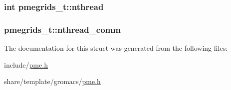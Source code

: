 \hypertarget{structpmegrids__t_a128cb4bc98b58e690cdf26e3d920a8ad}{
\subsubsection[{nthread}]{\setlength{\rightskip}{0pt plus 5cm}int {\bf pmegrids\-\_\-t\-::nthread}}}\label{structpmegrids__t_a128cb4bc98b58e690cdf26e3d920a8ad}
\hypertarget{structpmegrids__t_a89e6151b276245126d3a4fdea855df54}{
\subsubsection[{nthread\-\_\-comm}]{ {\bf pmegrids\-\_\-t\-::nthread\-\_\-comm}}}\label{structpmegrids__t_a89e6151b276245126d3a4fdea855df54}


\-The documentation for this struct was generated from the following files\-:\begin{DoxyCompactItemize}
\item 
include/\hyperlink{include_2pme_8h}{pme.\-h}\item 
share/template/gromacs/\hyperlink{share_2template_2gromacs_2pme_8h}{pme.\-h}\end{DoxyCompactItemize}
